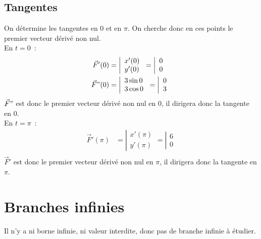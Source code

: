 \documentclass{article}
\begin{document}
\subsection{Tangentes}
On détermine les tangentes en $0$ et en $\pi$.
On cherche donc en ces points le premier vecteur dérivé non nul.\\
En $t=0$~:
\begin{align*}
        \vec{F}'(0)&=\left|\begin{array}{l}
                x'(0)\\y'(0)
        \end{array}\right.
        =          \left|\begin{array}{l}
                0\\0
        \end{array}\right.\\
        \vec{F}"(0)&=\left|\begin{array}{l}
                3\sin 0\\3\cos 0
        \end{array}\right.
        =          \left|\begin{array}{l}
                0\\3
        \end{array}\right.
\end{align*}
$\vec{F}"$ est donc le premier vecteur dérivé non nul en $0$, il dirigera donc la tangente en $0$.\\
En $t=\pi$~:
\begin{align*}
        \vec{F}'(\pi)&=\left|\begin{array}{l}
                x'(\pi)\\y'(\pi)
        \end{array}\right.
        =          \left|\begin{array}{l}
                6\\0
        \end{array}\right.\\
\end{align*}
$\vec{F}'$ est donc le premier vecteur dérivé non nul en $\pi$, il dirigera donc la tangente en $\pi$.
\section{Branches infinies}
Il n'y a ni borne infinie, ni valeur interdite, donc pas de branche infinie à étudier.
\end{document}
